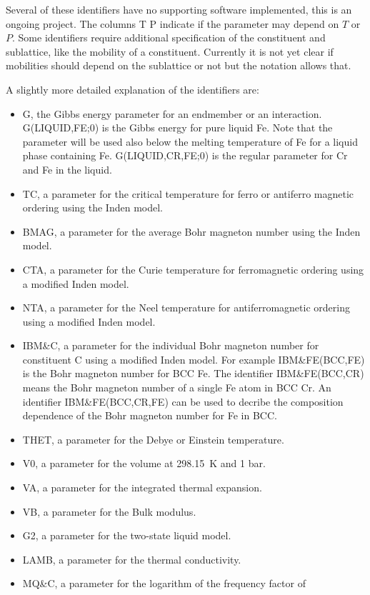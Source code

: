 \documentclass[11pt]{article}
\begin{document}
Several of these identifiers have no supporting software implemented,
this is an ongoing project.  The columns T P indicate if the parameter
may depend on $T$ or $P$.  Some identifiers require additional
specification of the constituent and sublattice, like the mobility of
a constituent.  Currently it is not yet clear if mobilities should
depend on the sublattice or not but the notation allows that.

A slightly more detailed explanation of the identifiers are:

\begin{itemize}
\item G, the Gibbs energy parameter for an endmember or an
  interaction.  G(LIQUID,FE;0) is the Gibbs energy for pure liquid Fe.
  Note that the parameter will be used also below the melting
  temperature of Fe for a liquid phase containing Fe.  G(LIQUID,CR,FE;0)
  is the regular parameter for Cr and Fe in the liquid.
\item TC, a parameter for the critical temperature for ferro or
  antiferro magnetic ordering using the Inden model.
\item BMAG, a parameter for the average Bohr magneton number using
  the Inden model.
\item CTA, a parameter for the Curie temperature for ferromagnetic
  ordering using a modified Inden model.
\item NTA, a parameter for the Neel temperature for antiferromagnetic
  ordering using a modified Inden model.
\item IBM\&C, a parameter for the individual Bohr magneton number for
  constituent C using a modified Inden model.  For example
  IBM\&FE(BCC,FE) is the Bohr magneton number for BCC Fe.  The
  identifier IBM\&FE(BCC,CR) means the Bohr magneton number of a
  single Fe atom in BCC Cr.  An identifier IBM\&FE(BCC,CR,FE) can be
  used to decribe the composition dependence of the Bohr magneton
  number for Fe in BCC.
\item THET, a parameter for the Debye or Einstein temperature.
\item V0, a parameter for the volume at 298.15~K and 1 bar.
\item VA, a parameter for the integrated thermal expansion.
\item VB, a parameter for the Bulk modulus.
\item G2, a parameter for the two-state liquid model.
\item LAMB, a parameter for the thermal conductivity.
\item MQ\&C, a parameter for the logarithm of the frequency factor of

\end{itemize}
\end{document}
